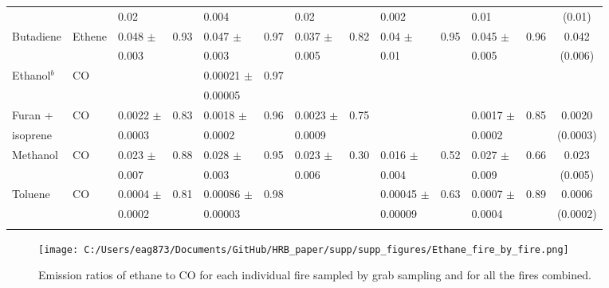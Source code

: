 \documentclass[acp, manuscript]{copernicus}
\begin{document}
\begin{sidewaystable}
\begin{tabular}{l l l l l l l l l l l l c }
    &&0.02&&0.004&&0.02&&0.002&&0.01&&(0.01)\\
    Butadiene & Ethene &0.048 $\pm$&0.93&0.047 $\pm$&0.97&0.037 $\pm$&0.82&0.04 $\pm$&0.95&0.045 $\pm$&0.96&0.042 \\
    &&0.003&&0.003&&0.005&&0.01&&0.005&&(0.006)\\
    Ethanol$^b$ & CO & & &0.00021 $\pm$&0.97&&&&&&& \\
     &&&&0.00005&&&&&&&&\\
    Furan +  & CO & 0.0022 $\pm$&0.83&0.0018 $\pm$&0.96&0.0023 $\pm$&0.75&&&0.0017 $\pm$&0.85&0.0020 \\
    isoprene&&0.0003&&0.0002&&0.0009&&&&0.0002&&(0.0003)\\
    Methanol & CO & 0.023 $\pm$&0.88&0.028 $\pm$&0.95&0.023 $\pm$ &0.30&0.016 $\pm$&0.52&0.027 $\pm$&0.66&0.023\\
     &&0.007&&0.003&&0.006&&0.004&&0.009&&(0.005)\\
    Toluene& CO &0.0004 $\pm$&0.81&0.00086 $\pm$&0.98&&&0.00045 $\pm$&0.63&0.0007 $\pm$&0.89&0.0006 \\
    &&0.0002&&0.00003&&&&0.00009&&0.0004&&(0.0002)\\
    \bottomhline 
  \end{tabular}
 \label{table:ER_by_fire}
\end{sidewaystable}



\begin{figure}
  \texttt{[image: C:/Users/eag873/Documents/GitHub/HRB\_paper/supp/supp\_figures/Ethane\_fire\_by\_fire.png]}
  \caption{Emission ratios of ethane to CO for each individual fire sampled by grab sampling and for all the fires combined. }
  \label{fig:Ethane}
\end{figure}
\end{document}
